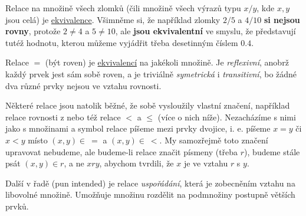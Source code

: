 \begin{example}
  \label{exam:ekvivalence-zlomky}
  Relace  na množině všech zlomků (čili množině všech
  výrazů typu $x / y$, kde $x, y$ jsou celá) je
  \hyperref[def:relace-ekvivalence]{ekvivalence}. Všimněme si, že například
  zlomky $2 / 5$ a $4 / 10$ \textbf{si nejsou rovny}, protože $2 \neq 4$ a $5
  \neq 10$, ale \textbf{jsou ekvivalentní} ve smyslu, že představují tutéž
  hodnotu, kterou můžeme vyjádřit třeba desetinným číslem $0.4$.
\end{example}
\begin{example}
  \label{exam:ekvivalence-rovnost}
  Relace $=$ (být roven) je \hyperref[def:relace-ekvivalence]{ekvivalencí} na
  jakékoli množině. Je \emph{reflexivní}, anobrž každý prvek jest sám sobě
  roven, a je triviálně \emph{symetrická} i \emph{transitivní}, bo žádné dva
  různé prvky nejsou ve vztahu rovnosti.
\end{example}

\begin{notation}
  Některé relace jsou natolik běžné, že sobě vysloužily vlastní značení,
  například relace rovnosti z  nebo
  též relace $<$ a $ \leq $ (více o nich níže). Nezacházíme s nimi jako s
  množinami a symbol relace píšeme mezi prvky dvojice, i. e. píšeme $x = y$ či
  $x < y$ místo  $(x, y) \in~=$ a $(x, y) \in~<$. My samozřejmě
  toto značení upravovat nebudeme, ale budeme-li relace značit písmeny (třeba
  $r$), budeme stále psát $(x, y) \in r$, a ne $xry$, abychom tvrdili, že $x$ je
  ve vztahu $r$ s $y$.
\end{notation}

Další v řadě (pun intended) je relace \emph{uspořádání}, která je zobecněním
vztahu  na libovolné množině. Umožňuje množinu rozdělit na
podmnožiny postupně větších prvků.


